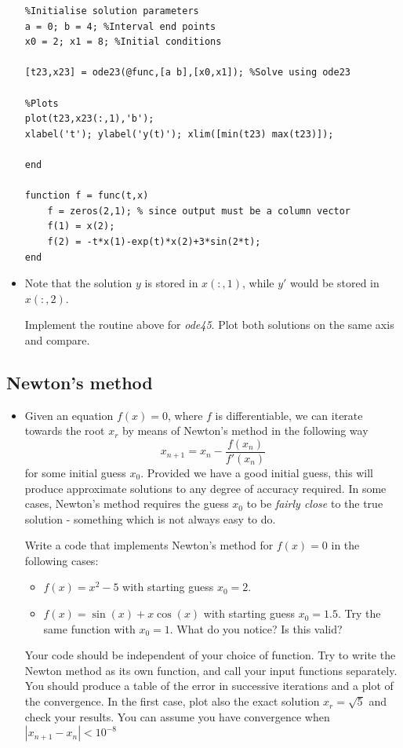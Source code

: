 \documentclass[12pt]{report}
\begin{document}
\begin{itemize}
\begin{lstlisting}
%Initialise solution parameters
a = 0; b = 4; %Interval end points
x0 = 2; x1 = 8; %Initial conditions

[t23,x23] = ode23(@func,[a b],[x0,x1]); %Solve using ode23

%Plots
plot(t23,x23(:,1),'b');
xlabel('t'); ylabel('y(t)'); xlim([min(t23) max(t23)]);

end

function f = func(t,x)
    f = zeros(2,1); % since output must be a column vector
    f(1) = x(2); 
    f(2) = -t*x(1)-exp(t)*x(2)+3*sin(2*t);
end
\end{lstlisting}
\item Note that the solution $y$ is stored in $x(:,1)$, while $y'$ would be stored in $x(:,2)$.
\begin{tcolorbox}[title=Task]
Implement the routine above for \textit{ode45}. Plot both solutions on the same axis and compare.
\end{tcolorbox}
\end{itemize}

\subsection*{Newton's method}

\begin{itemize}
\item Given an equation $f(x) = 0$, where $f$ is differentiable, we can iterate towards the root $x_r$ by means of Newton's method in the following way
\begin{displaymath}
x_{n+1} = x_n - \frac{f(x_n)}{f'(x_n)}
\end{displaymath} 
for some initial guess $x_0$. Provided we have a good initial guess, this will produce approximate solutions to any degree of accuracy required. In some cases, Newton's method requires the guess $x_0$ to be \textit{fairly close} to the true solution - something which is not always easy to do.
\begin{tcolorbox}[title=Task]
		Write a code that implements Newton's method for $f(x) = 0$ in the following cases:
		\begin{itemize}
		\item $f(x) = x^2 - 5$ with starting guess $x_0 = 2$.
		\item $f(x) = \sin(x)+x\cos(x)$ with starting guess $x_0 = 1.5$. Try the same function with $x_0 = 1$. What do you notice? Is this valid?
		\end{itemize}
		\tcblower
		Your code should be independent of your choice of function. Try to write the Newton method as its own function, and call your input functions separately. You should produce a table of the error in successive iterations and a plot of the convergence. In the first case, plot also the exact solution $x_r = \sqrt{5}$ and check your results. You can assume you have convergence when $|x_{n+1} - x_n| < 10^{-8}$
	\end{tcolorbox}
\end{itemize}
\end{document}
